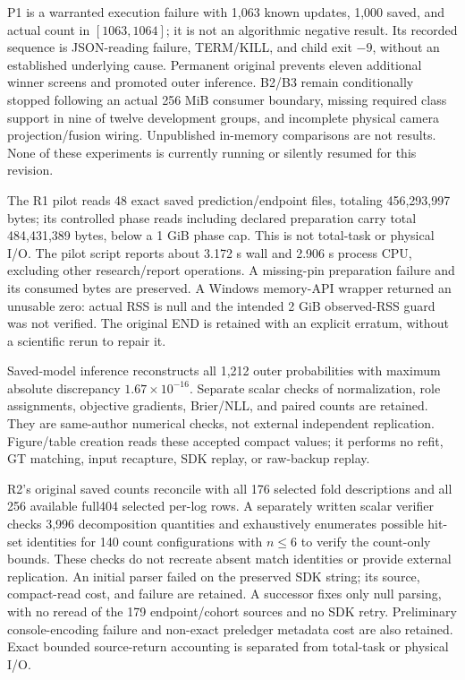 \documentclass[conference]{IEEEtran}
\newcommand{\code}[1]{\texttt{\detokenize{#1}}}
\begin{document}
P1 is a warranted execution failure with 1,063 known updates, 1,000 saved, and actual count in $[1063,1064]$; it is not an algorithmic negative result. Its recorded sequence is JSON-reading failure, TERM/KILL, and child exit $-9$, without an established underlying cause. Permanent original \code{NO_PROMOTION} prevents eleven additional winner screens and promoted outer inference. B2/B3 remain conditionally stopped following an actual 256 MiB consumer boundary, missing required class support in nine of twelve development groups, and incomplete physical camera projection/fusion wiring. Unpublished in-memory comparisons are not results. None of these experiments is currently running or silently resumed for this revision.


The R1 pilot reads 48 exact saved prediction/endpoint files, totaling 456,293,997 bytes; its controlled phase reads including declared preparation carry total 484,431,389 bytes, below a 1 GiB phase cap. This is not total-task or physical I/O. The pilot script reports about 3.172 s wall and 2.906 s process CPU, excluding other research/report operations. A missing-pin preparation failure and its consumed bytes are preserved. A Windows memory-API wrapper returned an unusable zero: actual RSS is null and the intended 2 GiB observed-RSS guard was not verified. The original END is retained with an explicit erratum, without a scientific rerun to repair it.

Saved-model inference reconstructs all 1,212 outer probabilities with maximum absolute discrepancy $1.67\times10^{-16}$. Separate scalar checks of normalization, role assignments, objective gradients, Brier/NLL, and paired counts are retained. They are same-author numerical checks, not external independent replication. Figure/table creation reads these accepted compact values; it performs no refit, GT matching, input recapture, SDK replay, or raw-backup replay.

R2's original saved counts reconcile with all 176 selected fold descriptions and all 256 available full404 selected per-log rows. A separately written scalar verifier checks 3,996 decomposition quantities and exhaustively enumerates possible hit-set identities for 140 count configurations with $n\le6$ to verify the count-only bounds. These checks do not recreate absent match identities or provide external replication. An initial parser failed on the preserved SDK \code{null} string; its source, compact-read cost, and failure are retained. A successor fixes only null parsing, with no reread of the 179 endpoint/cohort sources and no SDK retry. Preliminary console-encoding failure and non-exact preledger metadata cost are also retained. Exact bounded source-return accounting is separated from total-task or physical I/O.
\end{document}
